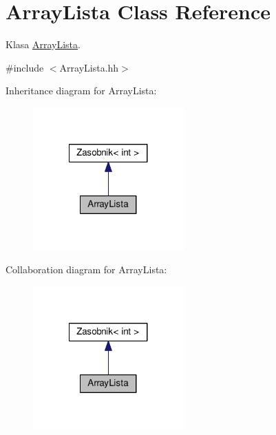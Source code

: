 \hypertarget{a00008}{}\section{Array\+Lista Class Reference}
\label{a00008}


Klasa \hyperlink{a00008}{Array\+Lista}.  




{\ttfamily \#include $<$Array\+Lista.\+hh$>$}



Inheritance diagram for Array\+Lista\+:
\nopagebreak
\begin{figure}[H]
\begin{center}
\leavevmode
\includegraphics[width=164pt]{a00122}
\end{center}
\end{figure}


Collaboration diagram for Array\+Lista\+:
\nopagebreak
\begin{figure}[H]
\begin{center}
\leavevmode
\includegraphics[width=164pt]{a00123}
\end{center}
\end{figure}
